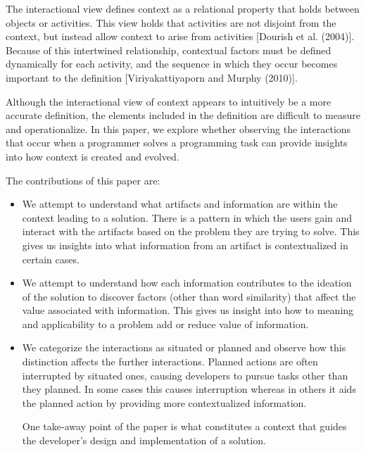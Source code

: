 The interactional view defines context as a relational property that holds between objects or activities. This view holds that activities are not disjoint from the context, but instead allow context to arise from activities [Dourish et al. (2004)]. Because of this intertwined relationship, contextual factors must be defined dynamically for each activity, and the sequence in which they occur becomes important to the definition [Viriyakattiyaporn and Murphy (2010)].

Although the interactional view of context appears to intuitively be a more accurate definition, the elements included in the definition are difficult to measure and operationalize. In this paper, we explore whether observing the interactions that occur when a programmer solves a programming task can provide insights into how context is created and evolved. 

The contributions of this paper are:
\begin{itemize}

\item We attempt to understand what artifacts and information are within the context leading to a solution. There is a pattern in which the users gain and interact with the artifacts based on the problem they are trying to solve. This gives us insights into what information from an artifact is contextualized in certain cases.

\item We attempt to understand how each information contributes to the  ideation of the solution to discover factors (other than word similarity) that affect the value associated with information. This gives us insight into how to meaning and applicability to a problem add or reduce value of information.

\item We categorize the interactions as situated or planned and observe how this distinction affects the further interactions. Planned actions are often interrupted by situated ones, causing developers to pursue tasks other than they planned. In some cases this causes interruption whereas in others it aids the planned action by providing more contextualized information. 

One take-away point of the paper is what constitutes a context that guides the developer's design and implementation of a solution.

\end{itemize}



